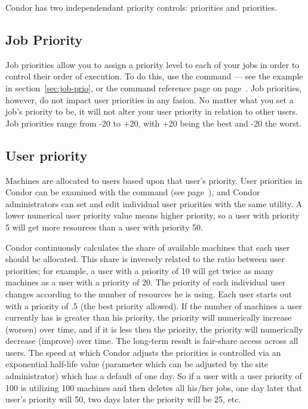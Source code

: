 Condor has two independendant priority controls: 
priorities and  priorities.  

\subsection{Job Priority}

Job priorities allow you to assign a priority level to each of your jobs in order to
control their order of execution.  To do this, use the 
command --- see the example in section~\ref{sec:job-prio}, or the
command reference page on page~\pageref{man-condor-prio}.  Job
priorities, however, do not impact user priorities in any fasion.  No matter what you
set a job's priority to be, it will not alter your user priority in
relation to other users.  Job priorities range from -20 to +20, with +20
being the best and -20 the worst.  

\subsection{User priority}
\label{sec:user-priority-explained}

Machines are allocated to users based upon that user's priority. User
priorities in Condor can be examined with the 
command (see page~\pageref{man-condor-userprio}),
and Condor administrators can set and edit individual user priorities
with the same utility. A lower numerical user priority value means
higher priority, so a user with priority 5 will get more resources than
a user with priority 50.  

Condor continuously calculates the share of available machines that each
user should be allocated.    This share is inversely related to the ratio
between user priorities; for example, a user with a priority of 10 will
get twice as many machines as a user with a priority of 20. The priority
of each individual user changes according to the number of resources he
is using. Each user starts out with a priority of .5 (the best
priority allowed).  If the number of machines a user currently has is greater than his
priority, the priority will numerically increase (worsen) over time, and if it is less then
the priority, the priority will numerically decrease (improve) over time. 
The long-term result is fair-share access across all users.  The speed
at which Condor adjusts the priorities is controlled via an exponential
half-life value (parameter  which can be adjusted
by the site administrator) which has a
default of one day.  So if a user with a user priority of 100 is
utilizing 100 machines and then deletes all his/her jobs, one day later that user's
priority will  50, two days later the priority will be 25, etc. 

